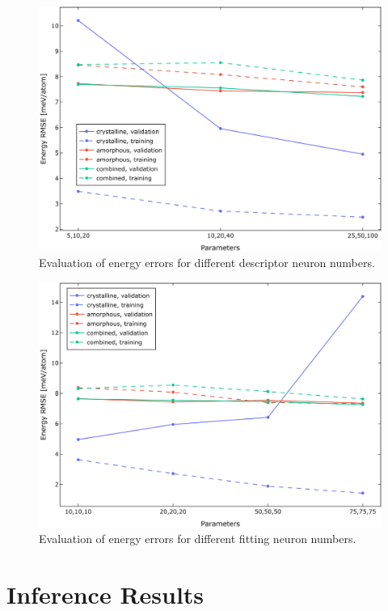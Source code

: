 \begin{figure}
  \begin{center}
    \includegraphics[width=.8\textwidth]{
      asset/descriptor_energy_error_evaluation.jpg
    }
  \end{center}
  \caption{Evaluation of energy errors for different descriptor neuron numbers.}
  \label{fig:descriptor_energy_error_evaluation}
\end{figure}

\begin{figure}
  \begin{center}
    \includegraphics[width=.8\textwidth]{
      asset/fitting_energy_error_evaluation.jpg
    }
  \end{center}
  \caption{Evaluation of energy errors for different fitting neuron numbers.}
  \label{fig:fitting_energy_error_evaluation}
\end{figure}

\section{Inference Results}


